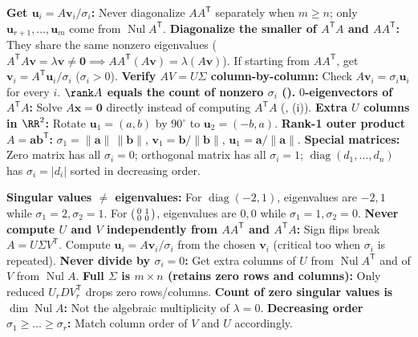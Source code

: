 \documentclass[10pt]{scrartcl}
\newcommand{\vv}[1]{\mathbf{#1}}
\DeclareMathOperator{\Nul}{Nul}
\begin{document}
\begin{shortcuts}
  \ii \textbf{Get $\vv u_i=A\vv v_i/\sigma_i$:} Never diagonalize $AA^{\mathsf T}$ separately when $m\ge n$; only $\vv u_{r+1},\dots,\vv u_m$ come from $\Nul A^{\mathsf T}$.
  \ii \textbf{Diagonalize the smaller of $A^{\mathsf T}A$ and $AA^{\mathsf T}$:} They share the same nonzero eigenvalues ($A^{\mathsf T}A\vv v=\lambda\vv v\neq\vv 0\implies AA^{\mathsf T}(A\vv v)=\lambda(A\vv v)$). If starting from $AA^{\mathsf T}$, get $\vv v_i=A^{\mathsf T}\vv u_i/\sigma_i$ ($\sigma_i>0$).
  \ii \textbf{Verify $AV=U\Sigma$ column-by-column:} Check $A\vv v_i=\sigma_i\vv u_i$ for every $i$.
  \ii \textbf{$\rank A$ equals the count of nonzero $\sigma_i$ ().}
  \ii \textbf{$0$-eigenvectors of $A^{\mathsf T}A$:} Solve $A\vv x=\vv 0$ directly instead of computing $A^{\mathsf T}A$ (, (i)).
  \ii \textbf{Extra $U$ columns in $\RR^2$:} Rotate $\vv u_1=(a,b)$ by $90^\circ$ to $\vv u_2=(-b,a)$.
  \ii \textbf{Rank-1 outer product $A=\vv a\vv b^{\mathsf T}$:} $\sigma_1=\|\vv a\|\,\|\vv b\|$, $\vv v_1=\vv b/\|\vv b\|$, $\vv u_1=\vv a/\|\vv a\|$.
  \ii \textbf{Special matrices:} Zero matrix has all $\sigma_i=0$; orthogonal matrix has all $\sigma_i=1$; $\operatorname{diag}(d_1,\dots,d_n)$ has $\sigma_i=|d_i|$ sorted in decreasing order.
\end{shortcuts}

\begin{trapbox}
  \ii \textbf{Singular values $\neq$ eigenvalues:} For $\operatorname{diag}(-2,1)$, eigenvalues are $-2,1$ while $\sigma_1=2,\sigma_2=1$. For $\begin{psmallmatrix}0&1\\0&0\end{psmallmatrix}$, eigenvalues are $0,0$ while $\sigma_1=1,\sigma_2=0$.
  \ii \textbf{Never compute $U$ and $V$ independently from $AA^{\mathsf T}$ and $A^{\mathsf T}A$:} Sign flips break $A=U\Sigma V^{\mathsf T}$. Compute $\vv u_i=A\vv v_i/\sigma_i$ from the chosen $\vv v_i$ (critical too when $\sigma_i$ is repeated).
  \ii \textbf{Never divide by $\sigma_i=0$:} Get extra columns of $U$ from $\Nul A^{\mathsf T}$ and of $V$ from $\Nul A$.
  \ii \textbf{Full $\Sigma$ is $m\times n$ (retains zero rows and columns):} Only reduced $U_r D V_r^{\mathsf T}$ drops zero rows/columns.
  \ii \textbf{Count of zero singular values is $\dim\Nul A$:} Not the algebraic multiplicity of $\lambda=0$.
  \ii \textbf{Decreasing order $\sigma_1\ge\dots\ge\sigma_r$:} Match column order of $V$ and $U$ accordingly.
\end{trapbox}
\end{document}
